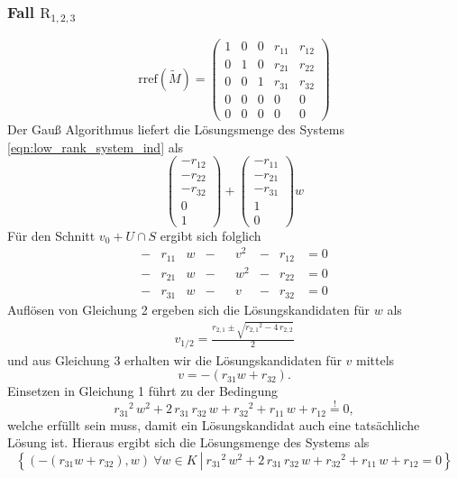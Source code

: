 \documentclass[a4paper,oneside, 11pt, openany%
]{article}
\theoremstyle{custom}
\theoremstyle{custom}
\begin{document}
\subsubsection*{Fall $\text{R}_{1,2,3}$}
\begin{equation*}\label{eqn:rref_r123}
	\text{rref}(\tilde{M}) =
	\left( \begin{array}{ccccc}
		1&0&0&r_{11}&r_{12}\\
		0&1&0&r_{21}&r_{22}\\
		0&0&1&r_{31}&r_{32}\\
		0&0&0&0&0\\
		0&0&0&0&0
	\end{array}\right)
\end{equation*}
Der Gauß Algorithmus liefert die Lösungsmenge des Systems \eqref{eqn:low_rank_system_ind} als
\begin{equation*}
	\begin{pmatrix}
		-r_{12}\\
		-r_{22}\\
		-r_{32}\\
		0\\
		1
	\end{pmatrix} +
	\begin{pmatrix}
		-r_{11}\\
		-r_{21}\\
		-r_{31}\\
		1\\
		0
	\end{pmatrix}w
\end{equation*}
Für den Schnitt $v_0 + U \cap S $ ergibt sich folglich
\begin{equation*}
	\begin{alignedat}{8}
		-&r_{11}&w&-&&v^2&-&r_{12}&=0\\
		-&r_{21}&w&-&&w^2&-&r_{22}&=0\\
		-&r_{31}&w&-&&v&-&r_{32}&=0
	\end{alignedat}
\end{equation*}
Auflösen von Gleichung 2 ergeben sich die Lösungskandidaten für $w$ als
\begin{gather}
	v_{1/2} =  \frac{r_{2,1} \pm \sqrt{{r_{2,1}}^2-4\,r_{2,2}}}{2}
\end{gather}
und aus Gleichung $3$ erhalten wir die Lösungskandidaten für $v$ mittels
\begin{equation*}
	v = -\left( r_{31}w+r_{32}\right).
\end{equation*}
Einsetzen in Gleichung 1 führt zu der Bedingung
\begin{equation*}
	{r_{31}}^2\,w^2+2\,r_{31}\,r_{32}\,w+{r_{32}}^2+r_{11}\,w+r_{12}\overset{!}{=}0,
\end{equation*}
welche erfüllt sein muss, damit ein Lösungskandidat auch eine tatsächliche Lösung ist.
Hieraus ergibt sich die Lösungsmenge des Systems als
\begin{equation*}
	\left\{\left(-\left( r_{31}w+r_{32}\right),w\right) \ \forall w \in K \ \left| \ {r_{31}}^2\,w^2+2\,r_{31}\,r_{32}\,w+{r_{32}}^2+r_{11}\,w+r_{12}=0 \right.\right\}
\end{equation*}
\end{document}
